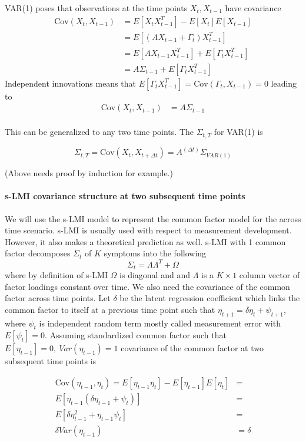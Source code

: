 \documentclass[
  letterpaper,
  DIV=11,
  numbers=noendperiod]{scrartcl}
\let\oldparagraph\paragraph
\renewcommand{\paragraph}[1]{\oldparagraph{#1}\mbox{}}
\begin{document}
VAR(1) poses that observations at the time points \(X_t, X_{t-1}\) have
covariance \[
\begin{align*}
\text{Cov}(X_t,X_{t-1})&=
E[X_tX_{t-1}^T]-E[X_t]E[X_{t-1}]\\&=
E[(AX_{t-1}+\Gamma_t)X_{t-1}^T]\\&=
E[AX_{t-1}X_{t-1}^T]+E[\Gamma_tX_{t-1}^T]\\&=
A\Sigma_{t-1}+E[\Gamma_tX_{t-1}^T]
\end{align*}
\] Independent innovations means that
\(E[\Gamma_tX_{t-1}^T]=\text{Cov}(\Gamma_t,X_{t-1})=0\) leading to \[
\begin{align*}
\text{Cov}(X_t,X_{t-1})&= A\Sigma_{t-1}\\
\end{align*}
\]

This can be generalized to any two time points. The \(\Sigma_{t,T}\) for
VAR(1) is

\[ \Sigma_{t,T}=\text{Cov}(X_t, X_{t+\Delta t}) = A^{(\Delta t)}\Sigma_{VAR(1)} \]

(Above needs proof by induction for example.)

\hypertarget{s-lmi-covariance-structure-at-two-subsequent-time-points}{%
\paragraph{s-LMI covariance structure at two subsequent time
points}\label{s-lmi-covariance-structure-at-two-subsequent-time-points}}

We will use the s-LMI model to represent the common factor model for the
across time scenario. s-LMI is usually used with respect to measurement
development. However, it also makes a theoretical prediction as well.
s-LMI with 1 common factor decomposes \(\Sigma_{t}\) of \(K\) symptoms
into the following \[\Sigma_t=\Lambda\Lambda^T+\Omega\]where by
definition of s-LMI \(\Omega\) is diagonal and and \(\Lambda\) is a
\(K\times1\) column vector of factor loadings constant over time. We
also need the covariance of the common factor across time points. Let
\(\delta\) be the latent regression coefficient which links the common
factor to itself at a previous time point such that
\(\eta_{t+1}=\delta\eta_{t}+\psi_{t+1}\), where \(\psi_t\) is
independent random term mostly called measurement error with
\(E[\psi_t]=0\). Assuming standardized common factor such that
\(E[\eta_{t-1}]=0,\:Var(\eta_{t-1})=1\) covariance of the common factor
at two subsequent time points is

\[
\begin{align*} \text{Cov}(\eta_{t-1},\eta_t)= E[\eta_{t-1}\eta_t]-E[\eta_{t-1}]E[\eta_t]&=\\ E[\eta_{t-1}(\delta\eta_{t-1}+\psi_t)]&=\\ E[\delta\eta_{t-1}^2+\eta_{t-1}\psi_t]&=\\ \delta Var(\eta_{t-1})&= \delta \end{align*}
\]
\end{document}
